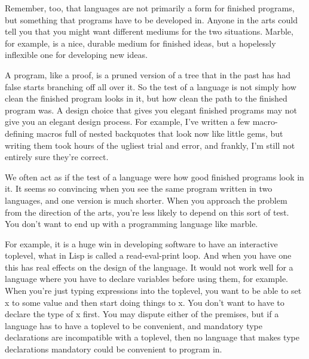 Remember,
                  too, that languages are not primarily a form for finished
                  programs, but something that programs have to be developed in.
                  Anyone in the arts could tell you that you might want
                  different mediums for the two situations. Marble, for example,
                  is a nice, durable medium for finished ideas, but a hopelessly
                  inflexible one for developing new ideas.

A program,
                  like a proof, is a pruned version of a tree that in the past
                  has had false starts branching off all over it. So the test of
                  a language is not simply how clean the finished program looks
                  in it, but how clean the path to the finished program was. A
                  design choice that gives you elegant finished programs may not
                  give you an elegant design process. For example, I've written
                  a few macro-defining macros full of nested backquotes that
                  look now like little gems, but writing them took hours of the
                  ugliest trial and error, and frankly, I'm still not entirely
                  sure they're correct.

We often act as if the test
                  of a language were how good finished programs look in it. It
                  seems so convincing when you see the same program written in
                  two languages, and one version is much shorter. When you
                  approach the problem from the direction of the arts, you're
                  less likely to depend on this sort of test. You don't want to
                  end up with a programming language like marble.

For
                  example, it is a huge win in developing software to have an
                  interactive toplevel, what in Lisp is called a read-eval-print
                  loop. And when you have one this has real effects on the
                  design of the language. It would not work well for a language
                  where you have to declare variables before using them, for
                  example. When you're just typing expressions into the
                  toplevel, you want to be able to set x to some value and then
                  start doing things to x. You don't want to have to declare the
                  type of x first. You may dispute either of the premises, but
                  if a language has to have a toplevel to be convenient, and
                  mandatory type declarations are incompatible with a toplevel,
                  then no language that makes type declarations mandatory could
                  be convenient to program in.



